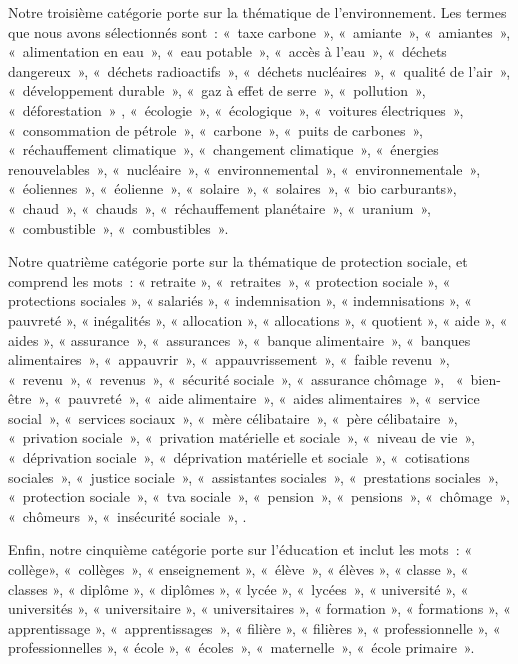 \documentclass[
  letterpaper,
  DIV=11,
  numbers=noendperiod]{scrartcl}
\begin{document}
Notre troisième catégorie porte sur la thématique de l'environnement.
Les termes que nous avons sélectionnés sont~: «~taxe carbone~»,
«~amiante~», «~amiantes~», «~alimentation en eau~», «~eau potable~»,
«~accès à l'eau~», «~déchets dangereux~», «~déchets radioactifs~»,
«~déchets nucléaires~», «~qualité de l'air~», «~développement durable~»,
«~gaz à effet de serre~», «~pollution~», «~déforestation~» ,
«~écologie~», «~écologique~», «~voitures électriques~», «~consommation
de pétrole~», «~carbone~», «~puits de carbones~», «~réchauffement
climatique~», «~changement climatique~», «~énergies renouvelables~»,
«~nucléaire~», «~environnemental~», «~environnementale~», «~éoliennes~»,
«~éolienne~», «~solaire~», «~solaires~», «~bio carburants», «~chaud~»,
«~chauds~», «~réchauffement planétaire~», «~uranium~», «~combustible~»,
«~combustibles~».

Notre quatrième catégorie porte sur la thématique de protection sociale,
et comprend les mots~: « retraite », «~retraites~», « protection sociale
», « protections sociales », « salariés », « indemnisation », «
indemnisations », « pauvreté », « inégalités », « allocation », «
allocations », « quotient », « aide », « aides », « assurance~»,
«~assurances~», «~banque alimentaire~», «~banques alimentaires~»,
«~appauvrir~», «~appauvrissement~», «~faible revenu~», «~revenu~»,
«~revenus~», «~sécurité sociale~», «~assurance chômage~»,
~«~bien-être~», «~pauvreté~», «~aide alimentaire~», «~aides
alimentaires~», «~service social~», «~services sociaux~», «~mère
célibataire~», «~père célibataire~», «~privation sociale~», «~privation
matérielle et sociale~», «~niveau de vie~», «~déprivation sociale~»,
«~déprivation matérielle et sociale~», «~cotisations sociales~»,
«~justice sociale~», «~assistantes sociales~», «~prestations sociales~»,
«~protection sociale~», «~tva sociale~», «~pension~», «~pensions~»,
«~chômage~», «~chômeurs~», «~insécurité sociale~», .

Enfin, notre cinquième catégorie porte sur l'éducation et inclut les
mots~: « collège», «~collèges~», « enseignement », «~élève~», « élèves
», « classe », « classes », « diplôme », « diplômes », « lycée »,
«~lycées~», « université », « universités », « universitaire », «
universitaires », « formation », « formations », « apprentissage »,
«~apprentissages~», « filière », « filières », « professionnelle », «
professionnelles », « école », «~écoles~», «~maternelle~», «~école
primaire~».
\end{document}
